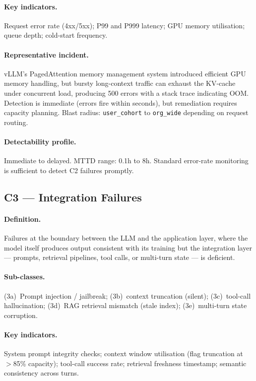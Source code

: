 \documentclass{article}
\begin{document}
\paragraph{Key indicators.}
Request error rate (4xx/5xx); P99 and P999 latency; GPU memory utilisation;
queue depth; cold-start frequency.

\paragraph{Representative incident.}
vLLM's PagedAttention memory management system \citep{kwon2023vllm} introduced
efficient GPU memory handling, but bursty long-context traffic can exhaust the
KV-cache under concurrent load, producing 500 errors with a stack trace
indicating OOM.  Detection is immediate (errors fire within seconds), but
remediation requires capacity planning.  Blast radius: \texttt{user\_cohort}
to \texttt{org\_wide} depending on request routing.

\paragraph{Detectability profile.}
Immediate to delayed.  MTTD range: 0.1h to 8h.  Standard error-rate monitoring
is sufficient to detect C2 failures promptly.

\subsection{C3 --- Integration Failures}

\paragraph{Definition.}
Failures at the boundary between the LLM and the application layer, where the
model itself produces output consistent with its training but the integration
layer --- prompts, retrieval pipelines, tool calls, or multi-turn state ---
is deficient.

\paragraph{Sub-classes.}
(3a)~Prompt injection / jailbreak; (3b)~context truncation (silent);
(3c)~tool-call hallucination; (3d)~RAG retrieval mismatch (stale index);
(3e)~multi-turn state corruption.

\paragraph{Key indicators.}
System prompt integrity checks; context window utilisation (flag truncation
at $>$85\% capacity); tool-call success rate; retrieval freshness timestamp;
semantic consistency across turns.
\end{document}
